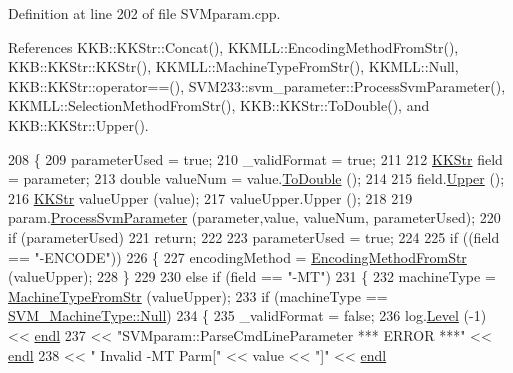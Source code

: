 Definition at line 202 of file S\+V\+Mparam.\+cpp.



References K\+K\+B\+::\+K\+K\+Str\+::\+Concat(), K\+K\+M\+L\+L\+::\+Encoding\+Method\+From\+Str(), K\+K\+B\+::\+K\+K\+Str\+::\+K\+K\+Str(), K\+K\+M\+L\+L\+::\+Machine\+Type\+From\+Str(), K\+K\+M\+L\+L\+::\+Null, K\+K\+B\+::\+K\+K\+Str\+::operator==(), S\+V\+M233\+::svm\+\_\+parameter\+::\+Process\+Svm\+Parameter(), K\+K\+M\+L\+L\+::\+Selection\+Method\+From\+Str(), K\+K\+B\+::\+K\+K\+Str\+::\+To\+Double(), and K\+K\+B\+::\+K\+K\+Str\+::\+Upper().


\begin{DoxyCode}
208 \{
209   parameterUsed = \textcolor{keyword}{true};
210   \_validFormat  = \textcolor{keyword}{true};
211 
212   \hyperlink{class_k_k_b_1_1_k_k_str}{KKStr}  field = parameter;
213   \textcolor{keywordtype}{double}  valueNum = value.\hyperlink{class_k_k_b_1_1_k_k_str_a95207190bd6a470ca0ef25ebea459c80}{ToDouble} ();
214 
215   field.\hyperlink{class_k_k_b_1_1_k_k_str_a66ea0feabc94da88591b56a683695bd9}{Upper} ();
216   \hyperlink{class_k_k_b_1_1_k_k_str}{KKStr} valueUpper (value);
217   valueUpper.Upper ();
218 
219   param.\hyperlink{struct_s_v_m233_1_1svm__parameter_ab5a7c97ba6772210f6071400dfae48db}{ProcessSvmParameter} (parameter,value, valueNum, parameterUsed);
220   \textcolor{keywordflow}{if}  (parameterUsed)
221     \textcolor{keywordflow}{return};
222 
223   parameterUsed = \textcolor{keyword}{true};
224 
225   \textcolor{keywordflow}{if} ((field == \textcolor{stringliteral}{"-ENCODE"}))
226   \{
227     encodingMethod = \hyperlink{namespace_k_k_m_l_l_a100cc09ba8368cc433f3f8643e3d0abb}{EncodingMethodFromStr} (valueUpper);
228   \}
229 
230   \textcolor{keywordflow}{else} \textcolor{keywordflow}{if}  (field == \textcolor{stringliteral}{"-MT"})
231   \{
232     machineType = \hyperlink{namespace_k_k_m_l_l_a05f26527ddefaf91b278afcd8e7981e2}{MachineTypeFromStr} (valueUpper);
233     \textcolor{keywordflow}{if}  (machineType == \hyperlink{namespace_k_k_m_l_l_ad917464bc631109a3021cf02cd27af9aabbb93ef26e3c101ff11cdd21cab08a94}{SVM\_MachineType::Null})
234     \{
235       \_validFormat = \textcolor{keyword}{false};
236       log.\hyperlink{class_k_k_b_1_1_run_log_a32cf761d7f2e747465fd80533fdbb659}{Level} (-1) << \hyperlink{namespace_k_k_b_ad1f50f65af6adc8fa9e6f62d007818a8}{endl} 
237         << \textcolor{stringliteral}{"SVMparam::ParseCmdLineParameter     *** ERROR ***"} << \hyperlink{namespace_k_k_b_ad1f50f65af6adc8fa9e6f62d007818a8}{endl}
238         << \textcolor{stringliteral}{"                Invalid -MT Parm["} << value << \textcolor{stringliteral}{"]"} << \hyperlink{namespace_k_k_b_ad1f50f65af6adc8fa9e6f62d007818a8}{endl}

\end{DoxyCode}
